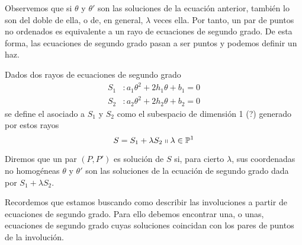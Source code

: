 Observemos que si $\theta$ y $\theta'$ son las soluciones de la ecuación anterior, también lo son del doble de ella, o de, en general, $\lambda$ veces ella. Por tanto, un par de puntos no ordenados es equivalente a un rayo de ecuaciones de segundo grado. De esta forma, las ecuaciones de segundo grado pasan a ser puntos y podemos definir un haz.
\begin{defi} Dados dos rayos de ecuaciones de segundo grado
\begin{equation}
	\begin{split}
		S_1&:a_1\theta^2+2h_1\theta+b_1=0\\
		S_2&:a_2\theta^2+2h_2\theta+b_2=0
	\end{split}
\end{equation}
se define el  asociado a $S_1$ y $S_2$ como el subespacio de dimensión 1 (?) generado por estos rayos
\begin{equation}
	S=S_1+\lambda S_2 \shortparallel \lambda\in\mathbb{P}^1
\end{equation}
\end{defi}
Diremos que un par $(P,P')$ es solución de $S$ si, para cierto $\lambda$, sus coordenadas no homogéneas $\theta$ y $\theta'$ son las soluciones de la ecuación de segundo grado dada por $S_1+\lambda S_2$.

Recordemos que estamos buscando como describir las involuciones a partir de ecuaciones de segundo grado. Para ello debemos encontrar una, o unas, ecuaciones de segundo grado cuyas soluciones coincidan con los pares de puntos de la involución.

